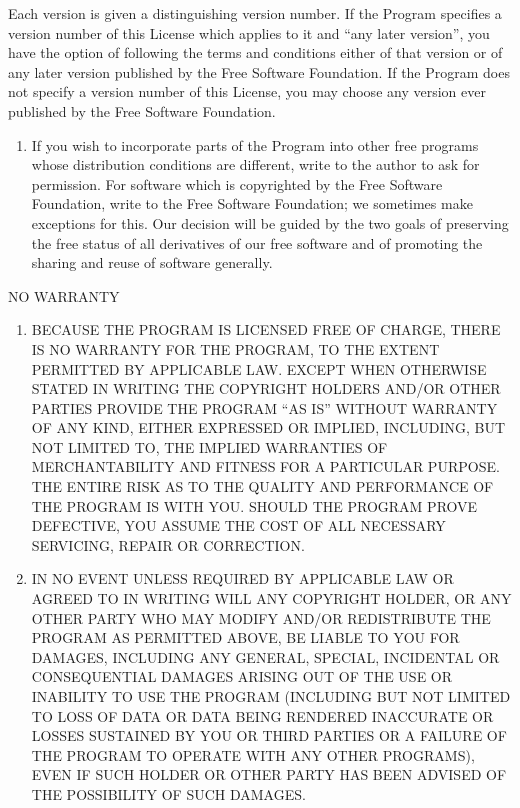 \documentclass[letterpaper,10pt,english]{sphinxmanual}
\begin{document}
\sphinxAtStartPar
Each version is given a distinguishing version number. If the Program specifies a version number of this License which applies to it and “any later version”, you have the option of following the terms and conditions either of that version or of any later version published by the Free Software Foundation. If the Program does not specify a version number of this License, you may choose any version ever published by the Free Software Foundation.
\begin{enumerate}
%
\setcounter{enumi}{9}
\item {} 
\sphinxAtStartPar
If you wish to incorporate parts of the Program into other free programs whose distribution conditions are different, write to the author to ask for permission. For software which is copyrighted by the Free Software Foundation, write to the Free Software Foundation; we sometimes make exceptions for this. Our decision will be guided by the two goals of preserving the free status of all derivatives of our free software and of promoting the sharing and reuse of software generally.

\end{enumerate}

\sphinxAtStartPar
NO WARRANTY
\begin{enumerate}
%
\setcounter{enumi}{10}
\item {} 
\sphinxAtStartPar
BECAUSE THE PROGRAM IS LICENSED FREE OF CHARGE, THERE IS NO WARRANTY FOR THE PROGRAM, TO THE EXTENT PERMITTED BY APPLICABLE LAW. EXCEPT WHEN OTHERWISE STATED IN WRITING THE COPYRIGHT HOLDERS AND/OR OTHER PARTIES PROVIDE THE PROGRAM “AS IS” WITHOUT WARRANTY OF ANY KIND, EITHER EXPRESSED OR IMPLIED, INCLUDING, BUT NOT LIMITED TO, THE IMPLIED WARRANTIES OF MERCHANTABILITY AND FITNESS FOR A PARTICULAR PURPOSE. THE ENTIRE RISK AS TO THE QUALITY AND PERFORMANCE OF THE PROGRAM IS WITH YOU. SHOULD THE PROGRAM PROVE DEFECTIVE, YOU ASSUME THE COST OF ALL NECESSARY SERVICING, REPAIR OR CORRECTION.

\item {} 
\sphinxAtStartPar
IN NO EVENT UNLESS REQUIRED BY APPLICABLE LAW OR AGREED TO IN WRITING WILL ANY COPYRIGHT HOLDER, OR ANY OTHER PARTY WHO MAY MODIFY AND/OR REDISTRIBUTE THE PROGRAM AS PERMITTED ABOVE, BE LIABLE TO YOU FOR DAMAGES, INCLUDING ANY GENERAL, SPECIAL, INCIDENTAL OR CONSEQUENTIAL DAMAGES ARISING OUT OF THE USE OR INABILITY TO USE THE PROGRAM (INCLUDING BUT NOT LIMITED TO LOSS OF DATA OR DATA BEING RENDERED INACCURATE OR LOSSES SUSTAINED BY YOU OR THIRD PARTIES OR A FAILURE OF THE PROGRAM TO OPERATE WITH ANY OTHER PROGRAMS), EVEN IF SUCH HOLDER OR OTHER PARTY HAS BEEN ADVISED OF THE POSSIBILITY OF SUCH DAMAGES.

\end{enumerate}
\end{document}
